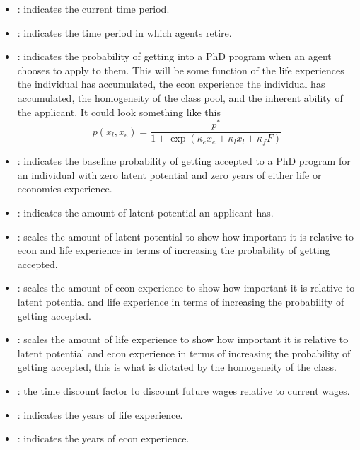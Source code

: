 \documentclass[11pt,english]{article}
\begin{document}
\begin{itemize}
\item {}: indicates the current time period.

\item {}: indicates the time period in which agents retire.

\item {}: indicates the probability of getting into a PhD program when an agent chooses to apply to them. This will be some function of the life experiences the individual has accumulated, the econ experience the individual has accumulated, the homogeneity of the class pool, and the inherent ability of the applicant. It could look something like this $$p(x_l, x_e) = \frac{p^*}{1 + \exp{(\kappa_e x_e + \kappa_l x_l + \kappa_f F)}}$$

\item {}: indicates the baseline probability of getting accepted to a PhD program for an individual with zero latent potential and zero years of either life or economics experience.

\item {}: indicates the amount of latent potential an applicant has.

\item {}: scales the amount of latent potential to show how important it is relative to econ and life experience in terms of increasing the probability of getting accepted.

\item {}: scales the amount of econ experience to show how important it is relative to latent potential and life experience in terms of increasing the probability of getting accepted.

\item {}: scales the amount of life experience to show how important it is relative to latent potential and econ experience in terms of increasing the probability of getting accepted, this is what is dictated by the homogeneity of the class.

\item \pmb{$\beta$}: the time discount factor to discount future wages relative to current wages.

\item {}: indicates the years of life experience.

\item {}: indicates the years of econ experience.


\end{itemize}
\end{document}
